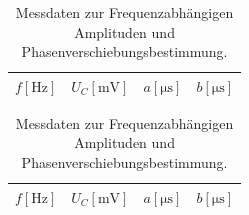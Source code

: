 \begin{table}
  \hspace*{\fill}
  \begin{subfigure}{0.40\textwidth}
  \centering
  \label{tab:2a}
  \begin{tabular}{c c c c}
    \toprule
     {$f [\si{\hertz}]$} & {$U_C [\si{\milli\volt}]$} & {$a [\si{\micro\second}]$} & {$b [\si{\micro\second}]$}\\
    \midrule
    
    \bottomrule
  \end{tabular}
\end{subfigure}
\hspace*{\fill}
\begin{subfigure}{0.40\textwidth}
  \centering
  \label{tab:2b}
  \begin{tabular}{c c c c}
    \toprule
    {$f [\si{\hertz}]$} & {$U_C [\si{\milli\volt}]$} & {$a [\si{\micro\second}]$} & {$b [\si{\micro\second}]$}\\
    \midrule
    
    \bottomrule
  \end{tabular}
\end{subfigure}
\\
\hspace*{\fill}
\hspace*{\fill}
\caption{Messdaten zur Frequenzabhängigen Amplituden und Phasenverschiebungsbestimmung.}
\label{tab:2}
\end{table}
%    


